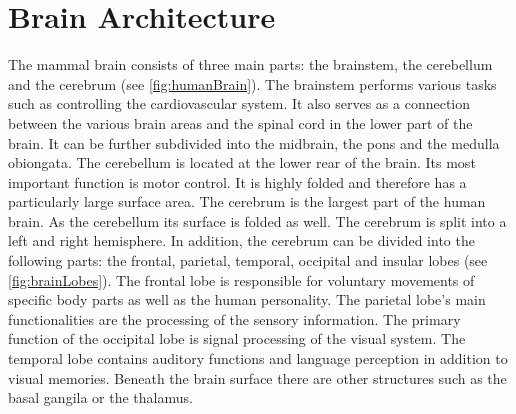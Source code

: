 \section{Brain Architecture}
%
The mammal brain consists of three main parts: the brainstem, the cerebellum and the cerebrum (see \cref{fig:humanBrain}).
% 
The brainstem performs various tasks such as controlling the cardiovascular system. It also serves as a connection between the various brain areas and the spinal cord in the lower part of the brain.
It can be further subdivided into the midbrain, the pons and the medulla obiongata.
The cerebellum is located at the lower rear of the brain.
Its most important function is motor control.
It is highly folded and therefore has a particularly large surface area.
The cerebrum is the largest part of the human brain.
As the cerebellum its surface is folded as well.
The cerebrum is split into a left and right hemisphere.
In addition, the cerebrum can be divided into the following parts:
the frontal, parietal, temporal, occipital and insular lobes (see \cref{fig:brainLobes}).
The frontal lobe is responsible for voluntary movements of specific body parts as well as the human personality.
The parietal lobe's main functionalities are the processing of the sensory information.
The primary function of the occipital lobe is signal processing of the visual system.
The temporal lobe contains auditory functions and language perception in addition to visual memories.
Beneath the brain surface there are other structures such as the basal gangila or the thalamus.
\par
% 
